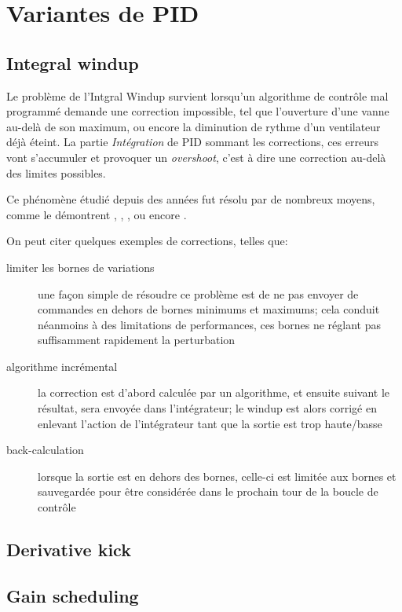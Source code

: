 \section{Variantes de PID}

\subsection{Integral windup}
Le problème de l'Intgral Windup survient lorsqu'un algorithme de contrôle mal programmé demande une correction impossible, tel que l'ouverture d'une vanne au-delà de son maximum, ou encore la diminution de rythme d'un ventilateur déjà éteint. La partie \emph{Intégration} de PID sommant les corrections, ces erreurs vont s'accumuler et provoquer un \emph{overshoot}, c'est à dire une correction au-delà des limites possibles.

Ce phénomène étudié depuis des années fut résolu par de nombreux moyens, comme le démontrent \cite{ControlGuruIntegralWindup}, \cite{astrom1995pid}, \cite{shin2012anti}, ou encore \cite{bohn1995analysis}.

On peut citer quelques exemples de corrections, telles que:
\begin{description}
\item[limiter les bornes de variations] une façon simple de résoudre ce problème est de ne pas envoyer de commandes en dehors de bornes minimums et maximums; cela conduit néanmoins à des limitations de performances, ces bornes ne réglant pas suffisamment rapidement la perturbation
\item[algorithme incrémental] la correction est d'abord calculée par un algorithme, et ensuite suivant le résultat, sera envoyée dans l'intégrateur; le windup est alors corrigé en enlevant l'action de l'intégrateur tant que la sortie est trop haute/basse
\item[back-calculation] lorsque la sortie est en dehors des bornes, celle-ci est limitée aux bornes et sauvegardée pour être considérée dans le prochain tour de la boucle de contrôle
\end{description}

\subsection{Derivative kick}

\subsection{Gain scheduling}

